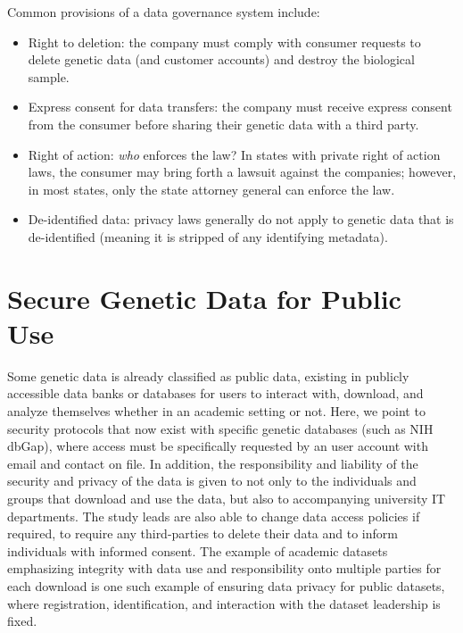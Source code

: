 Common provisions of a data governance system include:

    \begin{itemize}
       \item Right to deletion: the company must comply with consumer requests to delete genetic data (and customer accounts) and destroy the biological sample.
       \item Express consent for data transfers: the company must receive express consent from the consumer before sharing their genetic data with a third party. 
       \item Right of action: \textit{who} enforces the law? In states with private right of action laws, the consumer may bring forth a lawsuit against the companies; however, in most states, only the state attorney general can enforce the law.
       \item De-identified data: privacy laws generally do not apply to genetic data that is de-identified (meaning it is stripped of any identifying metadata). 
    \end{itemize}


\section{Secure Genetic Data for Public Use}
 Some genetic data is already classified as public data, existing in publicly accessible data banks or databases for users to interact with, download, and analyze themselves whether in an academic setting or not. Here, we point to security protocols that now exist with specific genetic databases (such as NIH dbGap), where access must be specifically requested by an user account with email and contact on file. In addition, the responsibility and liability of the security and privacy of the data is given to not only to the individuals and groups that download and use the data, but also to accompanying university IT departments. The study leads  are also able to change data access policies if required, to require any third-parties to delete their data and to inform individuals with informed consent. The example of academic datasets emphasizing integrity with data use and responsibility onto multiple parties for each download is one such example of ensuring data privacy for public datasets, where registration, identification, and interaction with the dataset leadership is fixed. 